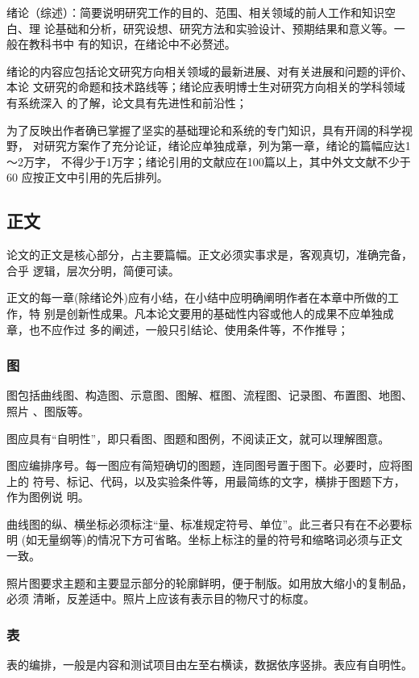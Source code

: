 \documentclass[oneside, phd]{njuthesis}
\begin{document}
绪论（综述）：简要说明研究工作的目的、范围、相关领域的前人工作和知识空白、理
论基础和分析，研究设想、研究方法和实验设计、预期结果和意义等。一般在教科书中
有的知识，在绪论中不必赘述。

绪论的内容应包括论文研究方向相关领域的最新进展、对有关进展和问题的评价、本论
文研究的命题和技术路线等；绪论应表明博士生对研究方向相关的学科领域有系统深入
的了解，论文具有先进性和前沿性；

为了反映出作者确已掌握了坚实的基础理论和系统的专门知识，具有开阔的科学视野，
对研究方案作了充分论证，绪论应单独成章，列为第一章，绪论的篇幅应达1～2万字，
不得少于1万字；绪论引用的文献应在100篇以上，其中外文文献不少于60%
应按正文中引用的先后排列。

\subsection{正文}

论文的正文是核心部分，占主要篇幅。正文必须实事求是，客观真切，准确完备，合乎
逻辑，层次分明，简便可读。

正文的每一章(除绪论外)应有小结，在小结中应明确阐明作者在本章中所做的工作，特
别是创新性成果。凡本论文要用的基础性内容或他人的成果不应单独成章，也不应作过
多的阐述，一般只引结论、使用条件等，不作推导；

\subsubsection{图}

图包括曲线图、构造图、示意图、图解、框图、流程图、记录图、布置图、地图、照片
、图版等。

图应具有“自明性”，即只看图、图题和图例，不阅读正文，就可以理解图意。

图应编排序号。每一图应有简短确切的图题，连同图号置于图下。必要时，应将图上的
符号、标记、代码，以及实验条件等，用最简练的文字，横排于图题下方，作为图例说
明。

曲线图的纵、横坐标必须标注“量、标准规定符号、单位”。此三者只有在不必要标明
(如无量纲等)的情况下方可省略。坐标上标注的量的符号和缩略词必须与正文一致。

照片图要求主题和主要显示部分的轮廓鲜明，便于制版。如用放大缩小的复制品，必须
清晰，反差适中。照片上应该有表示目的物尺寸的标度。

\subsubsection{表}

表的编排，一般是内容和测试项目由左至右横读，数据依序竖排。表应有自明性。
\end{document}
